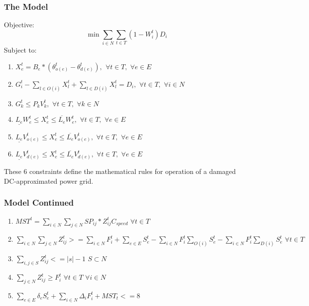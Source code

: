 \documentclass[t, pdftex]{beamer}
\begin{document}
\begin{frame}
\frametitle{The Model}
Objective:
$$ \min \sum_{i \in N} \sum_{t \in T} (1-W_i^t)D_i $$
Subject to:
\begin{enumerate}[label=(\arabic*), leftmargin=*, itemsep=0.4ex, before={\everymath{\displaystyle}}]

\item $ X_e^t = B_e * (\theta_{o(e)}^t - \theta_{d(e)}^t), \hspace{5pt} \forall t \in T, \hspace{4pt} \forall e \in E$
\item $ G_i^t - \sum_{l \in O(i)} X_l^t + \sum_{l \in D(i)} X_l^t = D_i, \hspace{4pt} \forall t \in T, \hspace{4pt} \forall i \in N$
\item $G_k^t \leq P_{k} V_{k}^t, \hspace{4pt} \forall t \in T, \hspace{4pt} \forall k \in N$
\item $\underline{L_e}W_{e}^t \leq X_{e}^t \leq \overline{L_e}W_{e}^t, \hspace{4pt} \forall t \in T, \hspace{4pt} \forall e \in E$
\item $\underline{L_e}V_{o(e)}^t \leq X_{e}^t \leq \overline{L_e}V_{o(e)}^t, \hspace{4pt} \forall t \in T, \hspace{4pt} \forall e \in E$
\item $\underline{L_e}V_{d(e)}^t \leq X_{e}^t \leq \overline{L_e}V_{d(e)}^t, \hspace{4pt} \forall t \in T, \hspace{4pt} \forall e \in E$
\end{enumerate}
These 6 constraints define the mathematical rules for operation of a damaged DC-approximated power grid.
\end{frame}
\begin{frame}
\frametitle{Model Continued}
\begin{enumerate}[label=(\arabic*), leftmargin=*, itemsep=0.4ex, before={\everymath{\displaystyle}}]
\item $MST^t = \sum_{i \in N} \sum_{j \in N} SP_{ij}*Z_{ij}^{t} C_{speed}\hspace{4pt} \forall t \in T $
\item $\sum_{i \in N} \sum_{j \in N} Z_{ij}^{t} >= \sum_{i \in N} F_i^t + \sum_{e \in E} S_e^t - \sum_{i \in N} F_i^t \sum_{O(i)} S_e^t - \sum_{i \in N} F_i^t \sum_{D(i)} S_e^t \hspace{4pt} \forall t \in T$
\item $\sum_{i,j \in S} Z_{ij}^t <= |s|-1 \hspace{4pt} S\subset N$
\item $ \sum_{j \in N} Z_{ij}^t \geq F_i^t \hspace{4pt} \forall t \in T\hspace{4pt} \forall i \in N $
\item $ \sum_{e \in E} \delta_{e}S_e^t + \sum_{i \in N}\Delta_{i}F_i^t + MST_t <=8$
\end{enumerate}

\end{frame}
\end{document}
